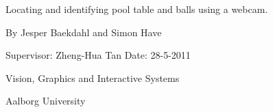 \begin{titlingpage}
  \thispagestyle{empty}
  \centering
  { \setlength{\baselineskip}{24pt}
    {\Huge Locating and identifying pool table and balls using a webcam.
    }\par
    \par\vspace*{4\onelineskip}
    \par




    \par\vspace*{2\onelineskip}
	\par\par
    \par
    
    \large By Jesper Baekdahl and Simon Have
  }
  \vfill
  \vspace*{2\onelineskip}
  Supervisor: Zheng-Hua Tan
  Date: 28-5-2011
  \par\vspace*{2\onelineskip}
  \small
  Vision, Graphics and Interactive Systems\par
  Aalborg University
  \enlargethispage{2\onelineskip}
\end{titlingpage}
